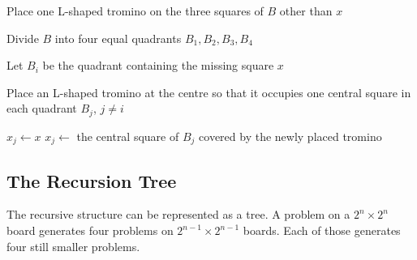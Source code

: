 \documentclass[12pt]{article}
\begin{document}
\begin{algorithm}[ht]
\caption{Recursive algorithm for tiling a deficient
$2^n\times2^n$ board}
\label{algo:tromino}
\begin{algorithmic}[1]


    \State Place one L-shaped tromino on the three squares of $B$
           other than $x$
    \State \Return
\EndIf

\State Divide $B$ into four equal quadrants
       $B_1,B_2,B_3,B_4$

\State Let $B_i$ be the quadrant containing the missing square $x$

\State Place an L-shaped tromino at the centre so that it occupies
       one central square in each quadrant $B_j$, $j\neq i$

        \State $x_j \gets x$
    \Else
        \State $x_j \gets$ the central square of $B_j$
               covered by the newly placed tromino
    \EndIf
    \State {}
\EndFor

\EndProcedure

\end{algorithmic}
\end{algorithm}


\subsection{The Recursion Tree}

The recursive structure can be represented as a tree. A problem on a
$2^n\times2^n$ board generates four problems on
$2^{n-1}\times2^{n-1}$ boards. Each of those generates four still
smaller problems.
\end{document}
